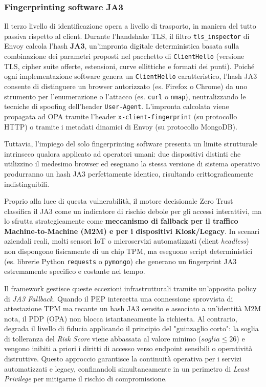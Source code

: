 \subsubsection{Fingerprinting software JA3}
Il terzo livello di identificazione opera a livello di trasporto, in maniera del tutto passiva rispetto al client. Durante l'handshake TLS, il filtro \texttt{tls\_inspector} di Envoy calcola l'hash \textbf{JA3}, un'impronta digitale deterministica basata sulla combinazione dei parametri proposti nel pacchetto di \texttt{ClientHello} (versione TLS, cipher suite offerte, estensioni, curve ellittiche e formati dei punti). Poiché ogni implementazione software genera un \texttt{ClientHello} caratteristico, l'hash JA3 consente di distinguere un browser autorizzato (es. Firefox o Chrome) da uno strumento per l'enumerazione o l'attacco (es. \texttt{curl} o \texttt{nmap}), neutralizzando le tecniche di spoofing dell'header \texttt{User-Agent}. L'impronta calcolata viene propagata ad OPA tramite l'header \texttt{x-client-fingerprint} (su protocollo HTTP) o tramite i metadati dinamici di Envoy (su protocollo MongoDB).

Tuttavia, l'impiego del solo fingerprinting software presenta un limite strutturale intrinseco qualora applicato ad operatori umani: due dispositivi distinti che utilizzino il medesimo browser ed eseguano la stessa versione di sistema operativo produrranno un hash JA3 perfettamente identico, risultando crittograficamente indistinguibili. 

Proprio alla luce di questa vulnerabilità, il motore decisionale Zero Trust classifica il JA3 come un indicatore di rischio debole per gli accessi interattivi, ma lo sfrutta strategicamente come \textbf{meccanismo di fallback per il traffico Machine-to-Machine (M2M) e per i dispositivi Kiosk/Legacy}. In scenari aziendali reali, molti sensori IoT o microservizi automatizzati (client \textit{headless}) non dispongono fisicamente di un chip TPM, ma eseguono script deterministici (es. librerie Python \texttt{requests} o \texttt{pymongo}) che generano un fingerprint JA3 estremamente specifico e costante nel tempo.

Il framework gestisce queste eccezioni infrastrutturali tramite un'apposita policy di \textit{JA3 Fallback}. Quando il PEP intercetta una connessione sprovvista di attestazione TPM ma recante un hash JA3 censito e associato a un'identità M2M nota, il PDP (OPA) non blocca istantaneamente la richiesta. Al contrario, degrada il livello di fiducia applicando il principio del "guinzaglio corto": la soglia di tolleranza del \textit{Risk Score} viene abbassata al valore minimo ($soglia \le 26$) e vengono inibiti a priori i diritti di accesso verso endpoint sensibili o operatività distruttive. Questo approccio garantisce la continuità operativa per i servizi automatizzati e legacy, confinandoli simultaneamente in un perimetro di \textit{Least Privilege} per mitigarne il rischio di compromissione.

